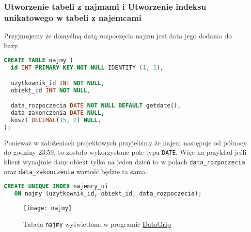 \subsubsection{Utworzenie tabeli z najmami i Utworzenie indeksu unikatowego w tabeli z najemcami}

Przyjmujemy że domyślną datą rozpoczęcia najmu jest data jego dodania do bazy.

\begin{lstlisting}[language=SQL, caption={Skrypt tworzący tabelę \texttt{obiekty}}, label={lst:table-najmy}]
CREATE TABLE najmy (
  id INT PRIMARY KEY NOT NULL IDENTITY (1, 1),

  uzytkownik_id INT NOT NULL,
  obiekt_id INT NOT NULL,

  data_rozpoczecia DATE NOT NULL DEFAULT getdate(),
  data_zakonczenia DATE NULL,
  koszt DECIMAL(15, 2) NULL,
);
\end{lstlisting}

Ponieważ w założeniach projektowych przyjeliśmy że najem następuje od północy do godziny 23:59, to zostało wykorzystane pole typu \texttt{DATE}. Więc na przykład jeśli klient wynajmie dany obiekt tylko na jeden dzień to w polach \texttt{data\_rozpoczecia} oraz \texttt{data\_zakonczenia} wartość będzie ta sama.

\begin{lstlisting}[language=SQL, caption={Skrypt tworzący indeks unikatowy w tabeli \texttt{obiekty}}, label={lst:table-najmy}]
CREATE UNIQUE INDEX najemcy_ui
   ON najmy (uzytkownik_id, obiekt_id, data_rozpoczecia);
\end{lstlisting}

\begin{figure}[h]
	\centering
    \texttt{[image: najmy]}
	\caption{Tabela \texttt{najmy} wyświetlona w programie \href{https://www.jetbrains.com/datagrip/}{DataGrip}}
	\label{fig:najmy}
\end{figure}